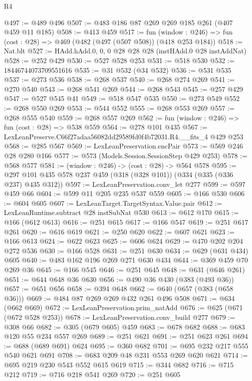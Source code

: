 \begin{lexlean}{R4}
\begin{coremodule}
@497 := @489 @496
@507 := @483 @186 @87 @269 @269 @185 @261 (@407 @459 @11 @185)
@508 := @413 @459
@517 := fun (window : @246) => fun (cost : @28) => @469 (@482 (@497 (@507 @508)) (@418 @253 @184))
@518 := Nat.blt
@527 := HAdd.hAdd.{0, 0, 0} @28 @28 @28 (instHAdd.{0} @28 instAddNat)
@528 := @252 @429
@530 := @527 @528 @253
@531 := @518 @530
@532 := 18446744073709551616
@535 := @31 @532 (@34 @532)
@536 := @531 @535
@537 := @273 @536
@538 := @268 @537
@540 := @268 @274 @269
@541 := @270 @540
@543 := @268 @541 @269
@544 := @268 @543
@545 := @257 @429
@547 := @527 @545 @41
@549 := @518 @547 @535
@550 := @273 @549
@552 := @268 @550 @269
@553 := @544 @552
@555 := @268 @553 @269
@557 := @268 @555 @540
@559 := @268 @557 @269
@562 := fun (window : @246) => fun (cost : @28) => @538 @559
@564 := @278 @101 @435
@567 := LexLeanPreserve.C66f27adaa56082dd29589fd0f4b72031.R4.__fits_4 @429 @253
@568 := @285 @567
@569 := LexLeanPreservation.encPair
@573 := @569 @246 @28 @280 @166
@577 := @573 (Models.Session.SessionStep @429 @253)
@578 := @568 @577
@581 := (window : @246) -> (cost : @28) -> @564 @578
@595 := @297 @101 @435 @578 @237 @459 (@318 (@328 @101)) (@334 (@335 (@336 @237) @435 @312))
@597 := LexLeanPreservation.conv_let @277
@599 := @597 @459 @66
@604 := @599 @11 @205 @235 @537 @559
@605 := @166 @530
@606 := @604 @605
@607 := LexLeanTarget.TargetSyntax.Value.pair
@612 := LexLeanRuntime.subtract @28 instSubNat @530
@613 := @612 @170
@615 := @166 (@612 @613)
@616 := @251 @615
@617 := @166 @547
@619 := @251 @617 @261
@620 := @616 @619
@621 := @250 @620
@622 := @607 @621
@623 := @166 @613
@624 := @622 @623
@625 := @606 @624
@629 := @470 @202 @204 @272 @536
@630 := @166 @528
@631 := @251 @630
@634 := @629 (@631 @434) @605
@640 := @483 @162 @196 @269 @271 @630 @434
@644 := @369 @459 @70 @269 @36
@645 := @166 @545
@646 := @251 @645
@648 := @631 (@646 @261)
@651 := @644 @648 @36 @630
@656 := @490 @36 @430 (@383 (@493 @36))
@657 := @651 @656
@658 := @394 @648
@662 := @640 (@657 (@383 (@658 @36)))
@669 := @484 @87 @269 @269 @432 @261 @496 @508
@671 := @634 (@662 @669)
@672 := LexLeanPreservation.prim_natAdd
@676 := @625 (@671 (@672 @528 @253))
@678 := LexLeanPreservation.conv_build @277
@679 := @308 @66
@682 := @305 (@679 @605) @459
@683 := @678 @682
@688 := @683 @120 @55 @234 @557 @269
@689 := @251 @621
@691 := @251 @623 @261
@694 := @688 (@689 @691) @624
@695 := @360 @682
@701 := @695 @232 @217 @555 @540 @621 @691
@708 := @683 @209 @48 @231 @553 @269 @620 @621
@714 := @695 @219 @230 @543 @552 @615 @619
@715 := @344 @682
@716 := @715 @212
@719 := @716 @218 @541 @269
@720 := @251 @605

\end{coremodule}
\end{lexlean}
